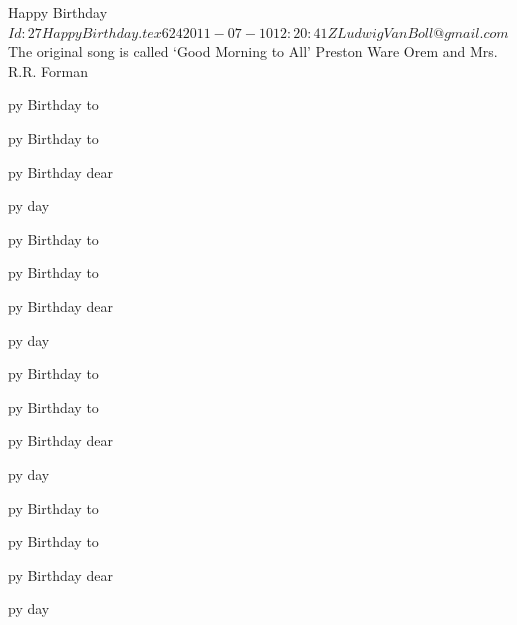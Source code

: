 \begin{SBSong}{Happy Birthday}
  {$Id: 27HappyBirthday.tex 624 2011-07-10 12:20:41Z LudwigVanBoll@gmail.com $}
  {The original song is called `Good Morning to All'}
  {Preston Ware Orem and Mrs. R.R. Forman}
  \begin{SBVerse}
    py Birthday to 
    
    py Birthday to 
 
    py Birthday dear 
   
    py day  
  \end{SBVerse}
  \ifChordBk
    \begin{SBVerse}  
      py Birthday to 
    
      py Birthday to 
 
      py Birthday dear 
   
      py day  
    \end{SBVerse}
    \begin{SBVerse}
      py Birthday to 
    
      py Birthday to 
 
      py Birthday dear 
   
      py day  
    \end{SBVerse}
    \begin{SBVerse}
      py Birthday to 
    
      py Birthday to 
 
      py Birthday dear 
   
      py day  
    \end{SBVerse}
  \fi
\end{SBSong}

